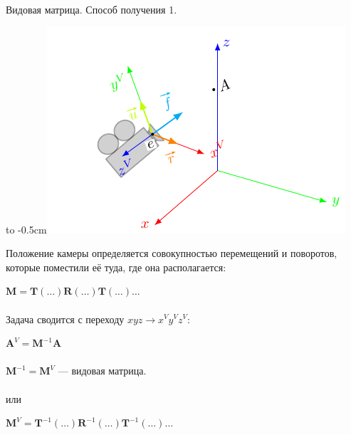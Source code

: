 \documentclass[10pt]{beamer}
\begin{document}
	
	\begin{frame} {Видовая матрица. Способ получения 1.}
		
		{
			\hbox to -0.5cm{}\includegraphics[page=2]{camera.pdf}
		}
		{
			Положение камеры определяется совокупностью перемещений и поворотов, которые поместили её туда, где она располагается:
			
			$ \mathbf M = \mathbf T(\dots)\mathbf R(\dots)\mathbf T(\dots)\dots $ \\~\\
			
			Задача сводится с переходу $xyz \rightarrow x^Vy^Vz^V $:
			
			$\mathbf A^V = \mathbf M^{-1}\mathbf A$ \\ ~ \\
			
			$ \mathbf M^{-1} = \mathbf M^V$ --- видовая матрица. \\ ~ \\
			
			или
			
			$\mathbf M^V =  \mathbf T^{-1}(\dots)\mathbf R^{-1}(\dots)\mathbf T^{-1}(\dots)\dots  $
			
		}
	\end{frame}
	
\end{document}
